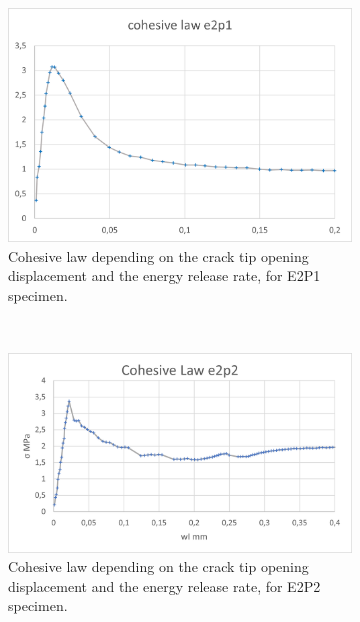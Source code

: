 \begin{figure}[H]
\centering
\begin{subfigure}{0.48\linewidth}
	\centering
	\includegraphics[scale=0.6]{Figures/e2p1_colaw}
	\decoRule
	\caption[Cohesive law from E2P1 specimen]{Cohesive law depending on the crack tip opening displacement and the energy release rate, for E2P1 specimen.}
	\label{fig:E2P1_colaw}
\end{subfigure}
\hfill\\
\begin{subfigure}{0.48\linewidth}
	\centering
	\includegraphics[scale=0.6]{Figures/e2p2_colaw}
	\decoRule
	\caption[Cohesive law from E2P2 specimen]{Cohesive law depending on the crack tip opening displacement and the energy release rate, for E2P2 specimen.}
	\label{fig:E2P2_colaw}
\end{subfigure}
\hfill\\
\begin{subfigure}{0.48\linewidth}
	\centering

\end{subfigure}
\end{figure}
